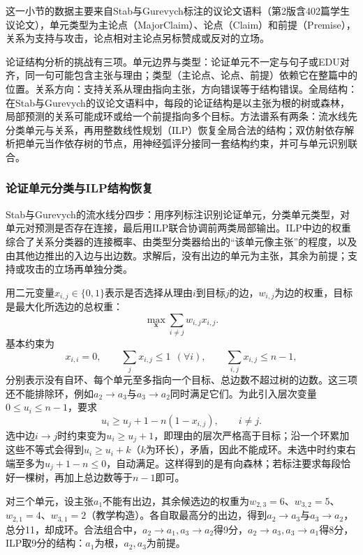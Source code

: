 这一小节的数据主要来自Stab与Gurevych标注的议论文语料（第2版含402篇学生议论文），单元类型为主论点（MajorClaim）、论点（Claim）和前提（Premise），关系为支持与攻击，论点相对主论点另标赞成或反对的立场。

论证结构分析的挑战有三项。单元边界与类型：论证单元不一定与句子或EDU对齐，同一句可能包含主张与理由；类型（主论点、论点、前提）依赖它在整篇中的位置。关系方向：支持关系从理由指向主张，方向错误等于结构错误。全局结构：在Stab与Gurevych的议论文语料中，每段的论证结构是以主张为根的树或森林，局部预测的关系可能成环或给一个前提指向多个目标。方法谱系有两条：流水线先分类单元与关系，再用整数线性规划（ILP）恢复全局合法的结构；双仿射依存解析把单元当作依存树的节点，用神经弧评分接同一套结构约束，并可与单元识别联合。

\subsubsection{论证单元分类与ILP结构恢复}
\label{sec:nlp-analysis-argument-ilp}

Stab与Gurevych的流水线分四步：用序列标注识别论证单元，分类单元类型，对单元对预测是否存在连接，最后用ILP联合协调前两类局部输出。ILP中边的权重综合了关系分类器的连接概率、由类型分类器给出的“该单元像主张”的程度，以及由其他边推出的入边与出边数。求解后，没有出边的单元为主张，其余为前提；支持或攻击的立场再单独分类。

用二元变量$x_{i,j}\in\{0,1\}$表示是否选择从理由$i$到目标$j$的边，$w_{i,j}$为边的权重，目标是最大化所选边的总权重：
\[
  \max_{\bm x}\sum_{i\neq j}w_{i,j}x_{i,j}.
\]
基本约束为
\[
  x_{i,i}=0,\qquad \sum_jx_{i,j}\leq1\ \ (\forall i),\qquad \sum_{i,j}x_{i,j}\leq n-1,
\]
分别表示没有自环、每个单元至多指向一个目标、总边数不超过树的边数。这三项还不能排除环，例如$a_2\to a_3$与$a_3\to a_2$同时满足它们。为此引入层次变量$0\leq u_i\leq n-1$，要求
\[
  u_i\geq u_j+1-n(1-x_{i,j}),\qquad i\neq j.
\]
选中边$i\to j$时约束变为$u_i\geq u_j+1$，即理由的层次严格高于目标；沿一个环累加这些不等式会得到$u_i\geq u_i+k$（$k$为环长），矛盾，因此不能成环。未选中时约束右端至多为$u_j+1-n\leq0$，自动满足。这样得到的是有向森林；若标注要求每段恰好一棵树，再加上总边数等于$n-1$即可。

对三个单元，设主张$a_1$不能有出边，其余候选边的权重为$w_{2,3}=6$、$w_{3,2}=5$、$w_{2,1}=4$、$w_{3,1}=2$（教学构造）。各自取最高分的出边，得到$a_2\to a_3$与$a_3\to a_2$，总分11，却成环。合法组合中，$a_2\to a_1,a_3\to a_2$得9分，$a_2\to a_3,a_3\to a_1$得8分，ILP取9分的结构：$a_1$为根，$a_2,a_3$为前提。

